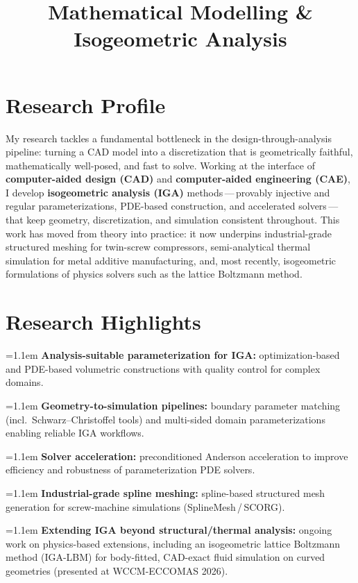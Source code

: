 \documentclass[11pt,a4paper,roman]{moderncv}
\title{Mathematical Modelling \& Isogeometric Analysis}
\newcommand{\scorg}{SCORG\texttrademark}    %
\newcommand{\fullitem}[1]{%
  \par\noindent\hangindent=1.1em\hangafter=1%
  \makebox[1.1em][l]{\color{color1}\listitemsymbol}#1\par\vspace{.2em}}
\begin{document}
\makecvtitle
\vspace*{-9mm}

\section{Research Profile}
\noindent My research tackles a fundamental bottleneck in the design-through-analysis
pipeline: turning a CAD model into a discretization that is geometrically
faithful, mathematically well-posed, and fast to solve. Working at the
interface of \textbf{computer-aided design (CAD)} and
\textbf{computer-aided engineering (CAE)}, I develop
\textbf{isogeometric analysis (IGA)} methods\,---\,provably injective and
regular parameterizations, PDE-based construction, and accelerated
solvers\,---\,that keep geometry, discretization, and simulation consistent
throughout. This work has moved from theory into practice: it now underpins
industrial-grade structured meshing for twin-screw compressors,
semi-analytical thermal simulation for metal additive manufacturing, and, most
recently, isogeometric formulations of physics solvers such as the lattice
Boltzmann method.\par

\section{Research Highlights}
\fullitem{\textbf{Analysis-suitable parameterization for IGA:}
  optimization-based and PDE-based volumetric constructions with quality
  control for complex domains.}
\fullitem{\textbf{Geometry-to-simulation pipelines:} boundary parameter
  matching (incl.\ Schwarz--Christoffel tools) and multi-sided domain
  parameterizations enabling reliable IGA workflows.}
\fullitem{\textbf{Solver acceleration:} preconditioned Anderson
  acceleration to improve efficiency and robustness of parameterization PDE
  solvers.}
\fullitem{\textbf{Industrial-grade spline meshing:} spline-based structured
  mesh generation for screw-machine simulations (SplineMesh\,/\,\scorg).}
\fullitem{\textbf{Extending IGA beyond structural/thermal analysis:}
  ongoing work on physics-based extensions, including an isogeometric lattice
  Boltzmann method (IGA-LBM) for body-fitted, CAD-exact fluid simulation on
  curved geometries (presented at WCCM-ECCOMAS 2026).}
\end{document}

